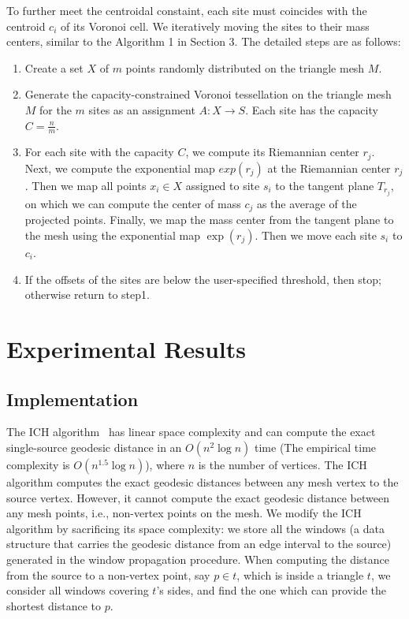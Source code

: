 To further meet the centroidal constaint, each site must coincides with the centroid $c_i$ of its Voronoi cell. We iteratively moving the sites to their mass centers, similar to the Algorithm 1 in Section 3. The detailed steps are as follows:
\begin{enumerate}
\item Create a set $X$ of $m$ points randomly distributed on the triangle mesh $M$.
\item Generate the capacity-constrained Voronoi tessellation on the triangle mesh $M$ for the $m$ sites as an assignment $A:X \rightarrow S$. Each site has the capacity $C=\frac{n}{m}$.
\item For each site with the capacity $C$, we compute its Riemannian center $r_j$. Next, we compute the exponential map $exp(r_j)$ at the Riemannian center $r_j$. Then we map all points ${x_i}\in{X}$ assigned to site $s_i$ to the tangent plane $T_{r_j}$, on which we can compute the center of mass $c_j$ as the average of the projected points. Finally, we map the mass center from the tangent plane to the mesh using the exponential map $\exp(r_j)$. Then we move each site $s_i$ to $c_i$.
\item If the offsets of the sites are below the user-specified threshold, then stop; otherwise return to step1.
\end{enumerate}
\fi

\section{Experimental Results} \label{sec:results}

\subsection{Implementation}\label{subsec:implementation}
The ICH algorithm~\cite{Xin_Wang:2009} has linear space complexity
and can compute the exact single-source geodesic distance in an
$O(n^2\log n)$ time (The empirical time complexity is $O(n^{1.5}\log
n)$), where $n$ is the number of vertices. The ICH algorithm
computes the exact geodesic distances between any mesh vertex to the
source vertex. However, it cannot compute the exact geodesic
distance between any mesh points, i.e., non-vertex points on the
mesh. We modify the ICH algorithm by sacrificing its space
complexity: we store all the windows (a data structure that carries
the geodesic distance from an edge interval to the source) generated
in the window propagation procedure. When computing the distance
from the source to a non-vertex point, say $p\in t$, which is inside
a triangle $t$, we consider all windows covering $t$'s sides, and
find the one which can provide the shortest distance to $p$.

